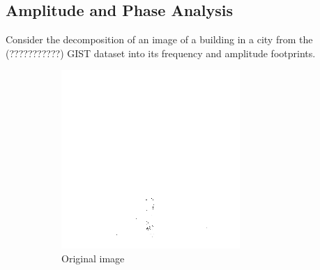 \documentclass{report}
\begin{document}
\subsection{Amplitude and Phase Analysis}
Consider the decomposition of an image of a building in a city from the (???????????) GIST dataset into its frequency and amplitude footprints.
\begin{figure}[H]
        \centering
        \begin{subfigure}[b]{0.2\textwidth}
                \includegraphics[width=\textwidth]{graphics/original.png}
                \caption{Original image}
                \label{fig:gull}
        \end{subfigure}%
        ~
        \begin{subfigure}[b]{0.2\textwidth}

\end{subfigure}
\end{figure}
\end{document}
